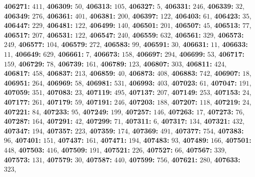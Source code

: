 \textsf{\bfseries 406271:} $411$, \textsf{\bfseries 406309:} $50$, \textsf{\bfseries 406313:} $105$, \textsf{\bfseries 406327:} $5$, \textsf{\bfseries 406331:} $246$, \textsf{\bfseries 406339:} $32$, \textsf{\bfseries 406349:} $276$, \textsf{\bfseries 406361:} $401$, \textsf{\bfseries 406381:} $200$, \textsf{\bfseries 406397:} $122$, \textsf{\bfseries 406403:} $61$, \textsf{\bfseries 406423:} $35$, \textsf{\bfseries 406447:} $229$, \textsf{\bfseries 406481:} $122$, \textsf{\bfseries 406499:} $140$, \textsf{\bfseries 406501:} $201$, \textsf{\bfseries 406507:} $45$, \textsf{\bfseries 406513:} $77$, \textsf{\bfseries 406517:} $207$, \textsf{\bfseries 406531:} $122$, \textsf{\bfseries 406547:} $240$, \textsf{\bfseries 406559:} $632$, \textsf{\bfseries 406561:} $329$, \textsf{\bfseries 406573:} $249$, \textsf{\bfseries 406577:} $104$, \textsf{\bfseries 406579:} $272$, \textsf{\bfseries 406583:} $99$, \textsf{\bfseries 406591:} $30$, \textsf{\bfseries 406631:} $11$, \textsf{\bfseries 406633:} $11$, \textsf{\bfseries 406649:} $629$, \textsf{\bfseries 406661:} $7$, \textsf{\bfseries 406673:} $158$, \textsf{\bfseries 406697:} $294$, \textsf{\bfseries 406699:} $53$, \textsf{\bfseries 406717:} $159$, \textsf{\bfseries 406729:} $78$, \textsf{\bfseries 406739:} $161$, \textsf{\bfseries 406789:} $123$, \textsf{\bfseries 406807:} $303$, \textsf{\bfseries 406811:} $424$, \textsf{\bfseries 406817:} $458$, \textsf{\bfseries 406837:} $213$, \textsf{\bfseries 406859:} $40$, \textsf{\bfseries 406873:} $408$, \textsf{\bfseries 406883:} $742$, \textsf{\bfseries 406907:} $18$, \textsf{\bfseries 406951:} $264$, \textsf{\bfseries 406969:} $58$, \textsf{\bfseries 406981:} $531$, \textsf{\bfseries 406993:} $403$, \textsf{\bfseries 407023:} $61$, \textsf{\bfseries 407047:} $191$, \textsf{\bfseries 407059:} $351$, \textsf{\bfseries 407083:} $23$, \textsf{\bfseries 407119:} $495$, \textsf{\bfseries 407137:} $207$, \textsf{\bfseries 407149:} $253$, \textsf{\bfseries 407153:} $24$, \textsf{\bfseries 407177:} $261$, \textsf{\bfseries 407179:} $59$, \textsf{\bfseries 407191:} $246$, \textsf{\bfseries 407203:} $188$, \textsf{\bfseries 407207:} $118$, \textsf{\bfseries 407219:} $24$, \textsf{\bfseries 407221:} $84$, \textsf{\bfseries 407233:} $95$, \textsf{\bfseries 407249:} $199$, \textsf{\bfseries 407257:} $146$, \textsf{\bfseries 407263:} $17$, \textsf{\bfseries 407273:} $76$, \textsf{\bfseries 407287:} $164$, \textsf{\bfseries 407291:} $42$, \textsf{\bfseries 407299:} $71$, \textsf{\bfseries 407311:} $6$, \textsf{\bfseries 407317:} $134$, \textsf{\bfseries 407321:} $432$, \textsf{\bfseries 407347:} $194$, \textsf{\bfseries 407357:} $223$, \textsf{\bfseries 407359:} $174$, \textsf{\bfseries 407369:} $491$, \textsf{\bfseries 407377:} $754$, \textsf{\bfseries 407383:} $96$, \textsf{\bfseries 407401:} $151$, \textsf{\bfseries 407437:} $161$, \textsf{\bfseries 407471:} $194$, \textsf{\bfseries 407483:} $93$, \textsf{\bfseries 407489:} $166$, \textsf{\bfseries 407501:} $448$, \textsf{\bfseries 407503:} $416$, \textsf{\bfseries 407509:} $191$, \textsf{\bfseries 407521:} $226$, \textsf{\bfseries 407527:} $66$, \textsf{\bfseries 407567:} $339$, \textsf{\bfseries 407573:} $131$, \textsf{\bfseries 407579:} $30$, \textsf{\bfseries 407587:} $440$, \textsf{\bfseries 407599:} $756$, \textsf{\bfseries 407621:} $280$, \textsf{\bfseries 407633:} $323$, 

